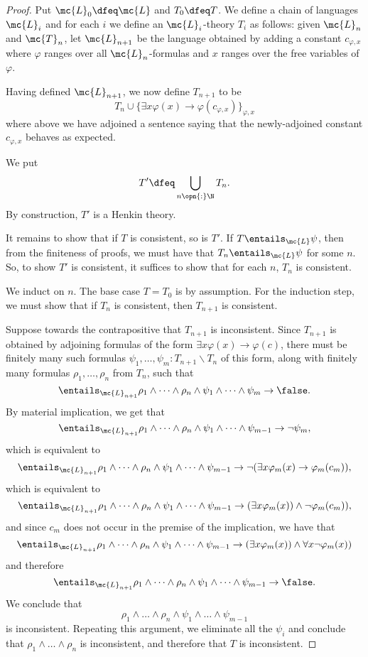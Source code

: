 \documentclass[11pt]{article}
\begin{document}
\begin{proof}
  Put $\mc{L}_0 \dfeq \mc{L}$ and $T_0 \dfeq T$. We define a chain of languages $\mc{L}_i$ and for each $i$ we define an $\mc{L}_i$-theory $T_i$ as follows: given $\mc{L}_n$ and $\mc{T}_n$, let $\mc{L}_{n+1}$ be the language obtained by adding a constant $c_{\varphi, x}$ where $\varphi$ ranges over all $\mc{L}_{n}$-formulas and $x$ ranges over the free variables of $\varphi$.

  Having defined $\mc{L}_{n+1}$, we now define $T_{n+1}$ to be
  $$
T_{n} \cup \{\exists x \varphi(x) \rightarrow \varphi(c_{\varphi,x})\}_{\varphi, x}
$$
where above we have adjoined a sentence saying that the newly-adjoined constant $c_{\varphi,x}$ behaves as expected.

We put $$T' \dfeq \displaystyle \bigcup_{n \opn{:} \N} T_n.$$ By construction, $T'$ is a Henkin theory.

It remains to show that if $T$ is consistent, so is $T'$. If $T \entails_{\mc{L}} \psi$, then from the finiteness of proofs, we must have that $T_n \entails_{\mc{L}} \psi$ for some $n$. So, to show $T'$ is consistent, it suffices to show that for each $n$, $T_n$ is consistent.

We induct on $n$. The base case $T = T_0$ is by assumption. For the induction step, we must show that if $T_n$ is consistent, then $T_{n+1}$ is consistent.

Suppose towards the contrapositive that $T_{n+1}$ is inconsistent. Since $T_{n+1}$ is obtained by adjoining formulas of the form $\exists x \varphi(x) \rightarrow \varphi(c)$, there must be finitely many such formulas $\psi_1, \dots, \psi_m : T_{n+1} \backslash T_n$ of this form, along with finitely many formulas $\rho_1, \dots, \rho_n$ from $T_n$, such that
$$
\entails_{\mc{L}_{n+1}} \rho_1 \wedge \dots \wedge \rho_n \wedge \psi_1 \wedge \dots \wedge \psi_m \to \false.
$$
By material implication, we get that
$$
\entails_{\mc{L}_{n+1}} \rho_1 \wedge \dots \wedge \rho_n \wedge \psi_1 \wedge \dots \wedge \psi_{m-1} \to \neg \psi_m,
$$
which is equivalent to
$$
\entails_{\mc{L}_{n+1}} \rho_1 \wedge \dots \wedge \rho_n \wedge \psi_1 \wedge \dots \wedge \psi_{m-1} \to \neg (\exists x \varphi_m(x) \rightarrow \varphi_m(c_m)),
$$
which is equivalent to
$$
\entails_{\mc{L}_{n+1}} \rho_1 \wedge \dots \wedge \rho_n \wedge \psi_1 \wedge \dots \wedge \psi_{m-1} \to (\exists x \varphi_m(x)) \wedge \neg \varphi_m(c_m)),
$$
and since $c_m$ does not occur in the premise of the implication, we have that
$$
\entails_{\mc{L}_{n+1}} \rho_1 \wedge \dots \wedge \rho_n \wedge \psi_1 \wedge \dots \wedge \psi_{m-1} \to (\exists x \varphi_m(x)) \wedge \forall x \neg \varphi_m(x))
$$
and therefore
$$
\entails_{\mc{L}_{n+1}} \rho_1 \wedge \dots \wedge \rho_n \wedge \psi_1 \wedge \dots \wedge \psi_{m-1} \to \false.
$$
We conclude that $$\rho_1 \wedge \dots \wedge \rho_n \wedge \psi_1 \wedge \dots \wedge \psi_{m-1}$$ is inconsistent. Repeating this argument, we eliminate all the $\psi_i$ and conclude that $\rho_1 \wedge \dots \wedge \rho_n$ is inconsistent, and therefore that $T$ is inconsistent.
\end{proof}
\end{document}
